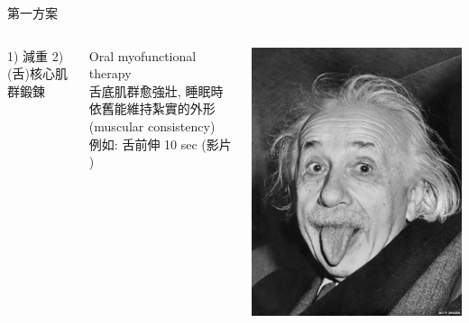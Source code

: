 \documentclass[aspectratio=169]{beamer}
\begin{document}
\begin{frame}{第一方案}

\begin{columns}
\begin{block}

1) 減重 \hspace{3cm} 2) (舌)核心肌群鍛鍊
~\\
~\\
\end{block}

\begin{block}

Oral myofunctional therapy\\
舌底肌群愈強壯, 睡眠時依舊能維持紮實的外形(muscular consistency)\\
例如: 舌前伸 10 sec (影片
\href{https://www.youtube.com/watch?v=f5FXSpkT9pk}{} )

\end{block}

\centering
\includegraphics[width=1\textwidth]{_82399978_75952740.jpg}
\end{columns}

\end{frame}
\end{document}
